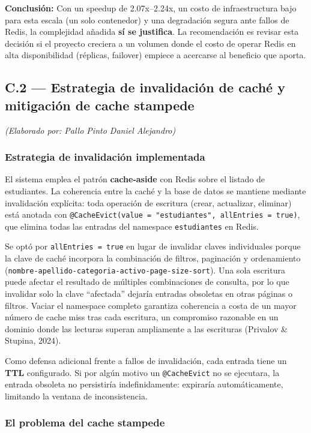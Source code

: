 \documentclass[12pt]{article}
\begin{document}
	\textbf{Conclusión:} Con un speedup de 2.07x--2.24x, un costo de infraestructura bajo para esta escala (un solo contenedor) y una degradación segura ante fallos de Redis, la complejidad añadida \textbf{sí se justifica}. La recomendación es revisar esta decisión si el proyecto creciera a un volumen donde el costo de operar Redis en alta disponibilidad (réplicas, failover) empiece a acercarse al beneficio que aporta.
	
	\subsection*{C.2 — Estrategia de invalidación de caché y mitigación de cache stampede}
	\textit{(Elaborado por: Pallo Pinto Daniel Alejandro)}
	
	\subsubsection*{Estrategia de invalidación implementada}
	
	El sistema emplea el patrón \textbf{cache-aside} con Redis sobre el listado de estudiantes. La coherencia entre la caché y la base de datos se mantiene mediante invalidación explícita: toda operación de escritura (crear, actualizar, eliminar) está anotada con \texttt{@CacheEvict(value = "estudiantes", allEntries = true)}, que elimina todas las entradas del namespace \texttt{estudiantes} en Redis.
	
	Se optó por \texttt{allEntries = true} en lugar de invalidar claves individuales porque la clave de caché incorpora la combinación de filtros, paginación y ordenamiento (\texttt{nombre-apellido-categoria-activo-page-size-sort}). Una sola escritura puede afectar el resultado de múltiples combinaciones de consulta, por lo que invalidar solo la clave ``afectada'' dejaría entradas obsoletas en otras páginas o filtros. Vaciar el namespace completo garantiza coherencia a costa de un mayor número de cache miss tras cada escritura, un compromiso razonable en un dominio donde las lecturas superan ampliamente a las escrituras (Privalov \& Stupina, 2024).
	
	Como defensa adicional frente a fallos de invalidación, cada entrada tiene un \textbf{TTL} configurado. Si por algún motivo un \texttt{@CacheEvict} no se ejecutara, la entrada obsoleta no persistiría indefinidamente: expiraría automáticamente, limitando la ventana de inconsistencia.
	
	\subsubsection*{El problema del cache stampede}
	
\end{document}
